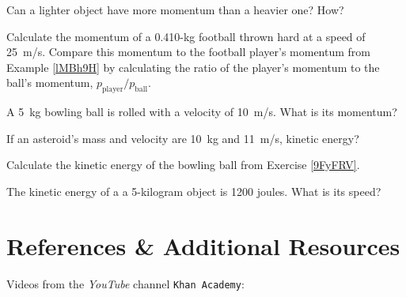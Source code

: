 \documentclass{article}
\begin{document}

\begin{exercise}
    Can a lighter object have more momentum than a heavier one? How?
\end{exercise}


\begin{exercise} \label{QDJrfn}
    Calculate the momentum of a 0.410-kg football thrown hard at a speed of \SI{25}{m/s}. Compare this momentum to the football player's momentum from Example \ref{lMBh9H} by calculating the ratio of the player's momentum to the ball's momentum, $p_{\text{player}}/p_{\text{ball}}$.
\end{exercise}

\begin{exercise} \label{9FyFRV}
    A \SI{5}{kg} bowling ball is rolled with a velocity of \SI{10}{m/s}. What is its momentum?
\end{exercise}


\begin{exercise} \label{5CHfrd}
    If an asteroid's mass and velocity are \SI{10}{kg} and \SI{11}{m/s}, kinetic energy?
\end{exercise}

\begin{exercise} \label{s9xduj}
    Calculate the kinetic energy of the bowling ball from Exercise \ref{9FyFRV}.
\end{exercise}

\begin{exercise} \label{pVdq3i}
    The kinetic energy of a a 5-kilogram object is 1200 joules. What is its speed?
\end{exercise}


\clearpage

\section{References \& Additional Resources}

Videos from the \textit{YouTube} channel \texttt{Khan Academy}:
\vspace{-1ex}
\end{document}
